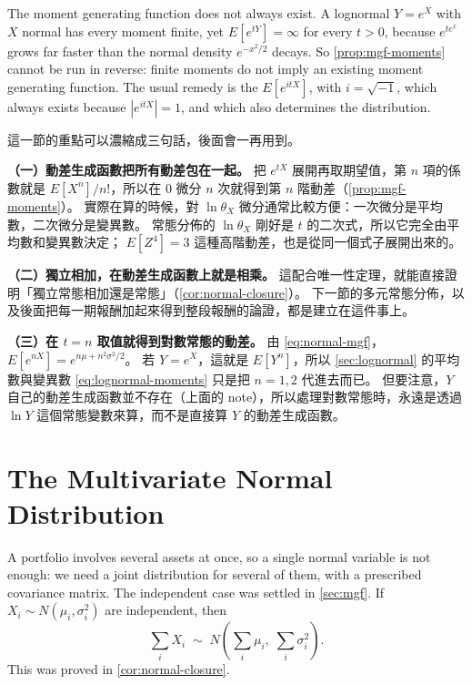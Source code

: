 \begin{note}
	The moment generating function does not always exist.
	A lognormal $Y=e^{X}$ with $X$ normal has every moment finite, yet $E[e^{tY}]=\infty$ for every $t>0$, because $e^{te^{x}}$ grows far faster than the normal density $e^{-x^{2}/2}$ decays.
	So \autoref{prop:mgf-moments} cannot be run in reverse: finite moments do not imply an existing moment generating function.
	The usual remedy is the  $E[e^{itX}]$, with $i=\sqrt{-1}$, which always exists because $|e^{itX}|=1$, and which also determines the distribution.
\end{note}

\begin{remark}
	這一節的重點可以濃縮成三句話，後面會一再用到。

	\textbf{（一）動差生成函數把所有動差包在一起。}
	把 $e^{tX}$ 展開再取期望值，第 $n$ 項的係數就是 $E[X^{n}]/n!$，所以在 $0$ 微分 $n$ 次就得到第 $n$ 階動差（\autoref{prop:mgf-moments}）。
	實際在算的時候，對 $\ln\theta_{X}$ 微分通常比較方便：一次微分是平均數，二次微分是變異數。
	常態分佈的 $\ln\theta_{X}$ 剛好是 $t$ 的二次式，所以它完全由平均數和變異數決定；
	$E[Z^{4}]=3$ 這種高階動差，也是從同一個式子展開出來的。

	\textbf{（二）獨立相加，在動差生成函數上就是相乘。}
	這配合唯一性定理，就能直接證明「獨立常態相加還是常態」（\autoref{cor:normal-closure}）。
	下一節的多元常態分佈，以及後面把每一期報酬加起來得到整段報酬的論證，都是建立在這件事上。

	\textbf{（三）在 $t=n$ 取值就得到對數常態的動差。}
	由 \eqref{eq:normal-mgf}，$E[e^{nX}]=e^{n\mu+n^{2}\sigma^{2}/2}$。
	若 $Y=e^{X}$，這就是 $E[Y^{n}]$，所以 \autoref{sec:lognormal} 的平均數與變異數 \eqref{eq:lognormal-moments} 只是把 $n=1,2$ 代進去而已。
	但要注意，$Y$ 自己的動差生成函數並不存在（上面的 note），所以處理對數常態時，永遠是透過 $\ln Y$ 這個常態變數來算，而不是直接算 $Y$ 的動差生成函數。
\end{remark}
\suppend

\section{The Multivariate Normal Distribution}
\label{sec:mvn}


A portfolio involves several assets at once, so a single normal variable is not enough: we need a joint distribution for several of them, with a prescribed covariance matrix.
The independent case was settled in \autoref{sec:mgf}.
If $X_{i}\sim N(\mu_{i},\sigma_{i}^{2})$ are independent, then
\[
	\sum_{i} X_{i} \;\sim\; N\left(\sum_{i}\mu_{i},\;\sum_{i}\sigma_{i}^{2}\right) .
\]
This was proved in \autoref{cor:normal-closure}.

